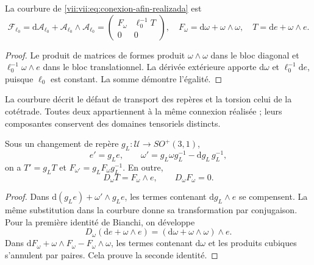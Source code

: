 \begin{proposition}
\label{vii:vii:prop:curvatura-afin}
La courbure de \eqref{vii:vii:eq:conexion-afin-realizada} est
\begin{equation}
 \mathcal F_{\ell_0}
 =\mathrm d\mathcal A_{\ell_0}
   +\mathcal A_{\ell_0}\wedge\mathcal A_{\ell_0}
 =\begin{pmatrix}F_\omega&\ell_0^{-1}T\\0&0\end{pmatrix},
 \quad F_\omega=\mathrm d\omega+\omega\wedge\omega,
 \quad T=\mathrm de+\omega\wedge e.
 \label{vii:vii:eq:curvatura-afin-realizada}
\end{equation}
\end{proposition}
\begin{proof}
Le produit de matrices de formes produit \(\omega\wedge\omega\) dans le bloc diagonal et \(\ell_0^{-1}\omega\wedge e\) dans le bloc translationnel. La dérivée extérieure apporte \(\mathrm d\omega\) et \(\ell_0^{-1}\mathrm de\), puisque \(\ell_0\) est constant. La somme démontre l'égalité.
\end{proof}

La courbure décrit le défaut de transport des repères et la torsion
celui de la cotétrade. Toutes deux appartiennent à la même connexion réalisée ;
leurs composantes conservent des domaines tensoriels distincts.

\begin{proposition}
\label{vii:vii:prop:bianchi-cartan}
Sous un changement de repère \(g_L:\mathcal U\to SO^+(3,1)\),
\[
 e'=g_Le,\qquad
 \omega'=g_L\omega g_L^{-1}-\mathrm dg_L\,g_L^{-1},
\]
on a \(T'=g_LT\) et \(F_{\omega'}=g_LF_\omega g_L^{-1}\). En outre,
\begin{equation}
 D_\omega T=F_\omega\wedge e,\qquad D_\omega F_\omega=0.
 \label{vii:vii:eq:bianchi-realizacion}
\end{equation}
\end{proposition}
\begin{proof}
Dans \(\mathrm d(g_Le)+\omega'\wedge g_Le\), les termes
contenant \(\mathrm dg_L\wedge e\) se compensent.
La même substitution dans la courbure donne sa transformation par
conjugaison. Pour la première identité de Bianchi, on développe
\[
 D_\omega(\mathrm de+\omega\wedge e)
 =(\mathrm d\omega+\omega\wedge\omega)\wedge e.
\]
Dans \(\mathrm dF_\omega+\omega\wedge F_\omega-F_\omega\wedge\omega\), les termes contenant \(\mathrm d\omega\) et les produits cubiques s'annulent par paires. Cela prouve la seconde identité.
\end{proof}

